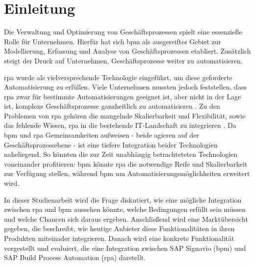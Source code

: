 \chapter{Einleitung}


Die Verwaltung und Optimierung von Geschäftsprozessen spielt eine essenzielle Rolle für Unternehmen. Hierfür hat sich \gls{bpm} als ausgereiftes Gebiet zur Modellierung, Erfassung und Analyse von Geschäftsprozessen etabliert. Zusätzlich steigt der Druck auf Unternehmen, Geschäftsprozesse weiter zu automatisieren.

\gls{rpa} wurde als vielversprechende Technologie eingeführt, um diese geforderte Automatisierung zu erfüllen. Viele Unternehmen mussten jedoch feststellen, dass \gls{rpa} zwar für bestimmte Automatisierungen geeignet ist, aber nicht in der Lage ist, komplexe Geschäftsprozesse ganzheitlich zu automatisieren \citep[S. 7]{Costa2022}. Zu den Problemen von \gls{rpa} gehören die mangelnde Skalierbarkeit und Flexibilität, sowie das fehlende Wissen, \gls{rpa} in die bestehende IT-Landschaft zu integrieren \citep{König2020RPA-BPMS}. Da \gls{bpm} und \gls{rpa} Gemeinsamkeiten aufweisen - beide agieren auf der Geschäftsprozessebene - ist eine tiefere Integration beider Technologien naheliegend. So könnten die zur Zeit unabhängig betrachteteten Technologien voneinander profitieren: \gls{bpm} könnte \gls{rpa} die notwendige Reife und Skalierbarkeit zur Verfügung stellen, während \gls{bpm} um Automatisierungsmöglichkeiten erweitert wird. 

In dieser Studienarbeit wird die Frage diskutiert, wie eine mögliche Integration zwischen \gls{rpa} und \gls{bpm} aussehen könnte, welche Bedingungen erfüllt sein müssen und welche Chancen sich daraus ergeben. Anschließend wird eine Marktübersicht gegeben, die beschreibt, wie heutige Anbieter diese Funktionalitäten in ihren Produkten miteinader integrieren. Danach wird eine konkrete Funktionalität vorgestellt und evaluiert, die eine Integration zwischen SAP Signavio (\gls{bpm}) und SAP Build Process Automation (\gls{rpa}) darstellt. 

